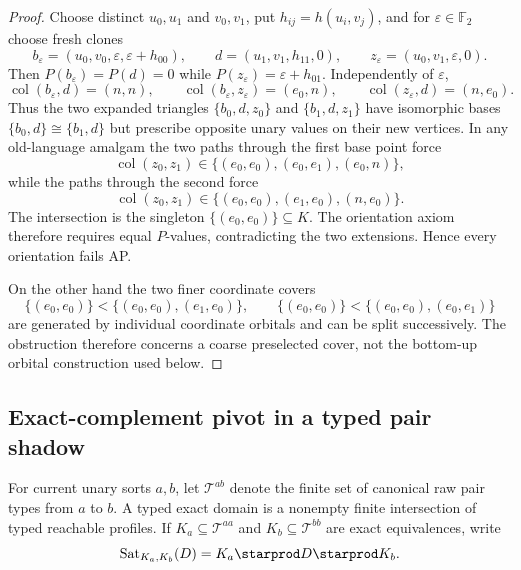\begin{proof}
Choose distinct $u_0,u_1$ and $v_0,v_1$, put
$h_{ij}=h(u_i,v_j)$, and for $\varepsilon\in\mathbb F_2$ choose fresh clones
\[
 b_\varepsilon=(u_0,v_0,\varepsilon,\varepsilon+h_{00}),
 \qquad d=(u_1,v_1,h_{11},0),
 \qquad z_\varepsilon=(u_0,v_1,\varepsilon,0).
\]
Then $P(b_\varepsilon)=P(d)=0$ while
$P(z_\varepsilon)=\varepsilon+h_{01}$.  Independently of $\varepsilon$,
\[
 \operatorname{col}(b_\varepsilon,d)=(n,n),\qquad
 \operatorname{col}(b_\varepsilon,z_\varepsilon)=(e_0,n),\qquad
 \operatorname{col}(z_\varepsilon,d)=(n,e_0).
\]
Thus the two expanded triangles
$\{b_0,d,z_0\}$ and $\{b_1,d,z_1\}$ have isomorphic bases
$\{b_0,d\}\cong\{b_1,d\}$ but prescribe opposite unary values on their new
vertices.  In any old-language amalgam the two paths through the first base
point force
\[
 \operatorname{col}(z_0,z_1)
 \in\{(e_0,e_0),(e_0,e_1),(e_0,n)\},
\]
while the paths through the second force
\[
 \operatorname{col}(z_0,z_1)
 \in\{(e_0,e_0),(e_1,e_0),(n,e_0)\}.
\]
The intersection is the singleton $\{(e_0,e_0)\}\subseteq K$.  The
orientation axiom therefore requires equal $P$-values, contradicting the two
extensions.  Hence every orientation fails AP.

On the other hand the two finer coordinate covers
\[
 \{(e_0,e_0)\}
 <\{(e_0,e_0),(e_1,e_0)\},
 \qquad
 \{(e_0,e_0)\}
 <\{(e_0,e_0),(e_0,e_1)\}
\]
are generated by individual coordinate orbitals and can be split
successively.  The obstruction therefore concerns a coarse preselected
cover, not the bottom-up orbital construction used below.
\end{proof}

\subsection{Exact-complement pivot in a typed pair shadow}

For current unary sorts $a,b$, let $\mathcal T^{ab}$ denote the finite set of
canonical raw pair types from $a$ to $b$.  A typed exact domain is a nonempty
finite intersection of typed reachable profiles.  If $K_a\subseteq
\mathcal T^{aa}$ and $K_b\subseteq\mathcal T^{bb}$ are exact equivalences,
write
\[
 \operatorname{Sat}_{K_a,K_b}(D)
   =K_a\starprod D\starprod K_b.
\]

